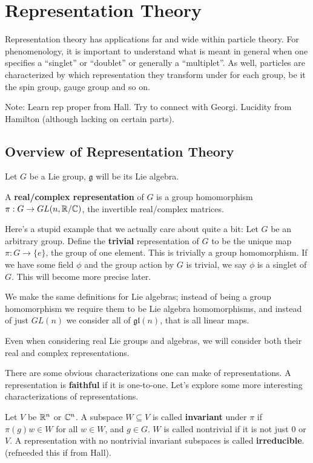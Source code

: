 \documentclass[main.tex]{subfiles}
\begin{document}
\chapter{Representation Theory}
Representation theory has applications far and wide within particle theory. For phenomenology, it is important to understand what is meant in general when one specifies a ``singlet'' or ``doublet'' or generally a ``multiplet''. As well, particles are characterized by which representation they transform under for each group, be it the spin group, gauge group and so on.

Note: Learn rep proper from Hall. Try to connect with Georgi. Lucidity from Hamilton (although lacking on certain parts).

\section{Overview of Representation Theory}
Let $G$ be a Lie group, $\mathfrak{g}$ will be its Lie algebra.

A \textbf{real/complex representation} of $G$ is a group homomorphism $\pi: G \to GL(n,\mathbb{R}/\mathbb{C})$, the invertible real/complex matrices.

Here's a stupid example that we actually care about quite a bit: Let $G$ be an arbitrary group. Define the \textbf{trivial} representation of $G$ to be the unique map $\pi: G \to \{e\}$, the group of one element. This is trivially a group homomorphism. If we have some field $\phi$ and the group action by $G$ is trivial, we say $\phi$ is a singlet of $G$. This will become more precise later.

We make the same definitions for Lie algebras; instead of being a group homomorphism we require them to be Lie algebra homomorphisms, and instead of just $GL(n)$ we consider all of $\mathfrak{gl} (n)$, that is all linear maps. 

Even when considering real Lie groups and algebras, we will consider both their real and complex representations.

There are some obvious characterizations one can make of representations. A representation is \textbf{faithful} if it is one-to-one. Let's explore some more interesting characterizations of representations. 

Let $V$ be $\mathbb{R}^n$ or $\mathbb{C}^n$. A subspace $W \subseteq V$ is called \textbf{invariant} under $\pi$ if $\pi(g) w \in W$ for all $w \in W$, and $g \in G$. $W$ is called nontrivial if it is not just $0$ or $V$. A representation with no nontrivial invariant subspaces is called \textbf{irreducible}. (refneeded this if from Hall).
\end{document}
